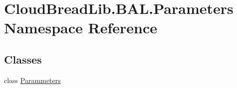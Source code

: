 \hypertarget{a00428}{}\section{Cloud\+Bread\+Lib.\+B\+A\+L.\+Parameters Namespace Reference}
\label{a00428}
\subsection*{Classes}
\begin{DoxyCompactItemize}
\item 
class \hyperlink{a00170}{Parammeters}
\end{DoxyCompactItemize}

